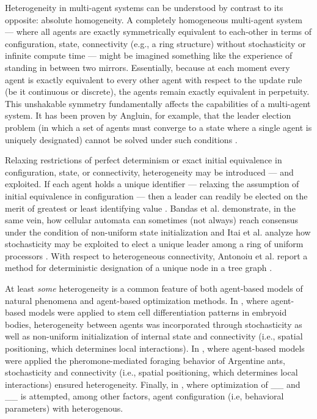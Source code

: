 Heterogeneity in multi-agent systems can be understood by contrast to its opposite: absolute homogeneity.
A completely homogeneous multi-agent system --- where all agents are exactly symmetrically equivalent to each-other in terms of configuration, state, connectivity (e.g., a ring structure) without stochasticity or infinite compute time --- might be imagined something like the experience of standing in between two mirrors.
Essentially, because at each moment every agent is exactly equivalent to every other agent with respect to the update rule (be it continuous or discrete), the agents remain exactly equivalent in perpetuity.
This unshakable symmetry fundamentally affects the capabilities of a multi-agent system.
It has been proven by Angluin, for example, that the leader election problem (in which a set of agents must converge to a state where a single agent is uniquely designated) cannot be solved under such conditions \cite{angluin1980local,banda2015configuration}.

Relaxing restrictions of perfect determinism or exact initial equivalence in configuration, state, or connectivity, heterogeneity may be introduced --- and exploited.
If each agent holds a unique identifier --- relaxing the assumption of initial equivalence in configuration --- then a leader can readily be elected on the merit of greatest or least identifying value \cite{frederickson1987electing}.
Bandas et al. demonstrate, in the same vein, how cellular automata can sometimes (not always) reach consensus under the condition of non-uniform state initialization \cite{banda2015configuration} and Itai et al. analyze how stochasticity may be exploited to elect a unique leader among a ring of uniform processors \cite{itai1981symmetry}.
With respect to heterogeneous connectivity, Antonoiu et al. report a method for deterministic designation of a unique node in a tree graph \cite{antonoiu1996self}.

At least \textit{some} heterogeneity is a common feature of both agent-based models of natural phenomena and agent-based optimization methods.
In \cite{atodd2015quantitative}, where agent-based models were applied to stem cell differentiation patterns in embryoid bodies, heterogeneity between agents was incorporated through stochasticity as well as non-uniform initialization of internal state and connectivity (i.e., spatial positioning, which determines local interactions).
In \cite{perna2012individual}, where agent-based models were applied the pheromone-mediated foraging behavior of Argentine ants, stochasticity and connectivity (i.e., spatial positioning, which determines local interactions) ensured heterogeneity.
Finally, in \cite{fayeez2017h}, where optimization of __ and __ is attempted, among other factors, agent configuration (i.e, behavioral parameters) with heterogenous.

